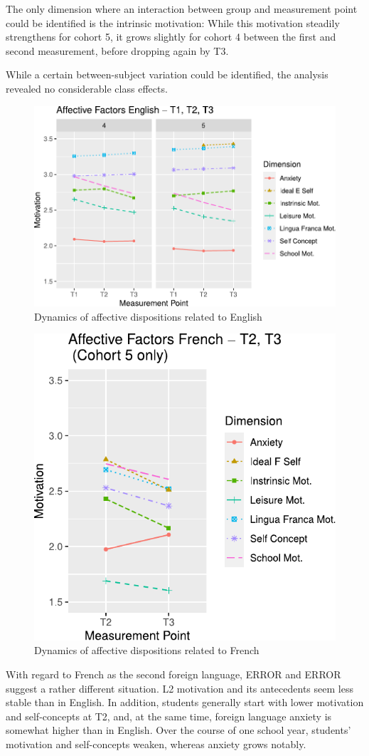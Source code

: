 \documentclass[output=paper]{langsci/langscibook}
\begin{document}
The only dimension where an interaction between group and measurement point could be identified is the intrinsic motivation: While this motivation steadily strengthens for cohort 5, it grows slightly for cohort 4 between the first and second measurement, before dropping again by T3. 

While a certain between-subject variation could be identified, the analysis revealed no considerable class effects.

\begin{figure}
\includegraphics[width=\textwidth]{figures/Fig8.1.pdf}
\caption{Dynamics of affective dispositions related to English\label{fig:08:1}}
\end{figure}

\begin{figure}
\includegraphics[width=.5\textwidth]{figures/Fig8.2.pdf}
\caption{Dynamics of affective dispositions related to French\label{fig:08:2}}
\end{figure}

With regard to French as the second foreign language, {ERROR}  and {ERROR}  suggest a rather different situation. L2 motivation and its antecedents seem less stable than in English. In addition, students generally start with lower motivation and self-concepts at T2, and, at the same time, foreign language anxiety is somewhat higher than in English. Over the course of one school year, students’ motivation and self-concepts weaken, whereas anxiety grows notably.
\end{document}
